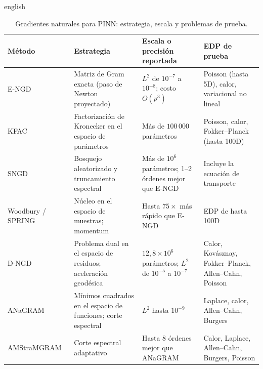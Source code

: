 \documentclass[../0000.tex]{subfiles}
\begin{document}
\begin{hyphenrules}{english}
\begin{table}[htbp]
\centering\small
\caption{Gradientes naturales para PINN: estrategia, escala y problemas de prueba.}
\label{tab:ea-ngd}
\begin{tabularx}{\textwidth}{@{}l >{\raggedright\arraybackslash}X >{\raggedright\arraybackslash}X >{\raggedright\arraybackslash}X@{}}
\toprule
Método & Estrategia & Escala o precisión reportada & EDP de prueba \\
\midrule
E-NGD~\cite{muller2023achieving} & Matriz de Gram exacta (paso de Newton proyectado) & $L^2$ de $10^{-7}$ a $10^{-8}$; costo $O(p^3)$ & Poisson (hasta 5D), calor, variacional no lineal \\
KFAC~\cite{dangel2024kronecker} & Factorización de Kronecker en el espacio de parámetros & Más de $100\,000$ parámetros & Poisson, calor, Fokker--Planck (hasta 100D) \\
SNGD~\cite{mckay2025near} & Bosquejo aleatorizado y truncamiento espectral & Más de $10^6$ parámetros; 1--2 órdenes mejor que E-NGD & Incluye la ecuación de transporte \\
Woodbury / SPRING~\cite{guzman2025improving} & Núcleo en el espacio de muestras; momentum & Hasta $75\times$ más rápido que E-NGD & EDP de hasta 100D \\
D-NGD~\cite{jnini2025dual} & Problema dual en el espacio de residuos; aceleración geodésica & $12{,}8\times10^6$ parámetros; $L^2$ de $10^{-5}$ a $10^{-7}$ & Calor, Kovásznay, Fokker--Planck, Allen--Cahn, Poisson \\
ANaGRAM~\cite{schwencke2025anagram} & Mínimos cuadrados en el espacio de funciones; corte espectral & $L^2$ hasta $10^{-9}$ & Laplace, calor, Allen--Cahn, Burgers \\
AMStraMGRAM~\cite{schwencke2025amstramgram} & Corte espectral adaptativo & Hasta 8 órdenes mejor que ANaGRAM & Calor, Laplace, Allen--Cahn, Burgers, Poisson \\
\bottomrule
\end{tabularx}
\end{table}


\end{hyphenrules}
\end{document}
